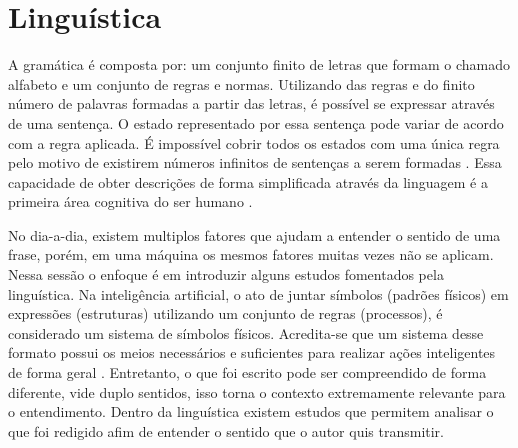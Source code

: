 \section{Linguística}
A gramática é composta por: um conjunto finito de letras que formam o chamado alfabeto e um conjunto de regras e normas. Utilizando das regras e do finito número de palavras formadas a partir das letras, é possível se expressar através de uma sentença. O estado representado por essa sentença pode variar de acordo com a regra aplicada. É impossível cobrir todos os estados com uma única regra pelo motivo de existirem números infinitos de sentenças a serem formadas \cite[13-25]{chomsky2002syntactic}. Essa capacidade de obter descrições de forma simplificada através da linguagem é a primeira área cognitiva do ser humano \cite[131]{putnam1975mind}.

No dia-a-dia, existem multiplos fatores que ajudam a entender o sentido de uma frase, porém, em uma máquina os mesmos fatores muitas vezes não se aplicam. Nessa sessão o enfoque é em introduzir alguns estudos fomentados pela linguística. Na inteligência artificial, o ato de juntar símbolos (padrões físicos) em expressões (estruturas) utilizando um conjunto de regras (processos), é considerado um sistema de símbolos físicos. Acredita-se que um sistema desse formato possui os meios necessários e suficientes para realizar ações inteligentes de forma geral \cite[116]{newell1976ComputerSA}. Entretanto, o que foi escrito pode ser compreendido de forma diferente, vide duplo sentidos, isso torna o contexto extremamente relevante para o entendimento. Dentro da linguística existem estudos que permitem analisar o que foi redigido afim de entender o sentido que o autor quis transmitir.



